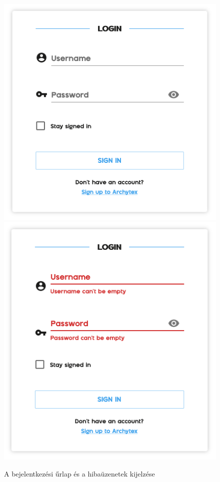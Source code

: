 \begin{figure}[H]
  \centering
  \includegraphics[scale=.6]{parts/user-documentation/account/images/login.png}
  \includegraphics[scale=.6]{parts/user-documentation/account/images/login-errors.png}
  \caption{A bejelentkezési űrlap és a hibaüzenetek kijelzése}
\end{figure}


